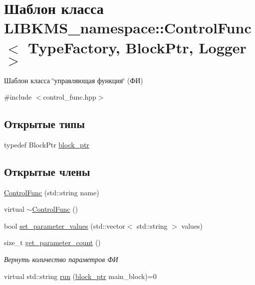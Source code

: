 \hypertarget{classLIBKMS__namespace_1_1ControlFunc}{\section{Шаблон класса L\-I\-B\-K\-M\-S\-\_\-namespace\-:\-:Control\-Func$<$ Type\-Factory, Block\-Ptr, Logger $>$}
\label{classLIBKMS__namespace_1_1ControlFunc}
}


Шаблон класса \char`\"{}управляющая функция\char`\"{} (ФИ)  




{\ttfamily \#include $<$control\-\_\-func.\-hpp$>$}

\subsection*{Открытые типы}
\begin{DoxyCompactItemize}
\item 
typedef Block\-Ptr \hyperlink{classLIBKMS__namespace_1_1ControlFunc_a4c0b78548d7ebcef58f9d5d2e2066c63}{block\-\_\-ptr}
\end{DoxyCompactItemize}
\subsection*{Открытые члены}
\begin{DoxyCompactItemize}
\item 
\hyperlink{classLIBKMS__namespace_1_1ControlFunc_a92c78d0cb0a753d1b6258ee940da449b}{Control\-Func} (std\-::string name)
\item 
virtual \hyperlink{classLIBKMS__namespace_1_1ControlFunc_affa6e4a9fefd45216ab78ee4ac0f5f12}{$\sim$\-Control\-Func} ()
\item 
bool \hyperlink{classLIBKMS__namespace_1_1ControlFunc_a31fcb06f6bf12131329726163f3d0302}{set\-\_\-parameter\-\_\-values} (std\-::vector$<$ std\-::string $>$ values)
\item 
size\-\_\-t \hyperlink{classLIBKMS__namespace_1_1ControlFunc_af5a5020e498ba27633a7d188ba5e6101}{get\-\_\-parameter\-\_\-count} ()
\begin{DoxyCompactList}\small\item\em Вернуть количество параметров ФИ \end{DoxyCompactList}\item 
virtual std\-::string \hyperlink{classLIBKMS__namespace_1_1ControlFunc_a907104ca1761cfb76d88aabda134c134}{run} (\hyperlink{classLIBKMS__namespace_1_1ControlFunc_a4c0b78548d7ebcef58f9d5d2e2066c63}{block\-\_\-ptr} main\-\_\-block)=0
\end{DoxyCompactItemize}
